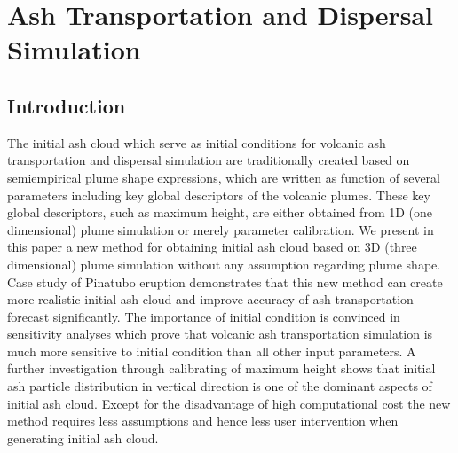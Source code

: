 \chapter{Ash Transportation and Dispersal Simulation}
\section{Introduction}

The initial ash cloud which serve as initial conditions for volcanic ash transportation and dispersal simulation are traditionally created based on semiempirical plume shape expressions, which are written as function of several parameters including key global descriptors of the volcanic plumes. These key global descriptors, such as maximum height, are either obtained from 1D (one dimensional) plume simulation or merely parameter calibration. We present in this paper a new method for obtaining initial ash cloud based on 3D (three dimensional) plume simulation without any assumption regarding plume shape. Case study of Pinatubo eruption demonstrates that this new method can create more realistic initial ash cloud and improve accuracy of ash transportation forecast significantly. The importance of initial condition is convinced in sensitivity analyses which prove that volcanic ash transportation simulation is much more sensitive to initial condition than all other input parameters. A further investigation through calibrating of maximum height shows that initial ash particle distribution in vertical direction is one of the dominant aspects of initial ash cloud.
Except for the disadvantage of high computational cost the new method requires less assumptions and hence less user intervention when generating initial ash cloud. 
 

